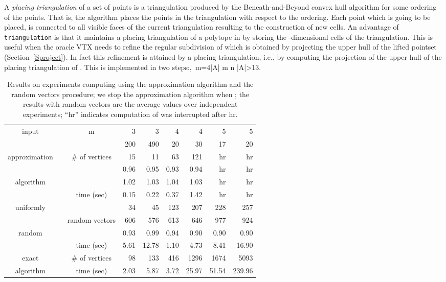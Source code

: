 \documentclass{article}
\def\A{{\mathcal A}} \def\R{{\mathcal R}}
\begin{document}
A {\it placing triangulation} of a set of points is a triangulation produced by
the Beneath-and-Beyond convex hull algorithm for some ordering of the points.
That is, the algorithm places the points in the triangulation with respect to
the ordering. Each point which is going to be placed, 
is connected to all
visible faces of the current triangulation resulting to the construction of new
cells. 
An advantage of {\tt triangulation} is that it maintains a placing
triangulation of a polytope in  by storing the -dimensional
cells of the triangulation. This is useful when the oracle VTX needs
to refine the regular subdivision of  which is obtained by projecting the
upper hull of the lifted pointset 
(Section~\ref{Sproject}).
In fact this refinement is attained by a placing triangulation, i.e., by
computing the projection of the upper hull of the placing triangulation of
.
This is implemented in two steps:,\ m=4|\A| m   n  |\A|>13.

\renewcommand{\tabcolsep}{0.3cm} \begin{table*}[t]\footnotesize
\centering
\begin{tabular}{@{} c@{}c @{\hspace{0.2cm}}
|@{\hspace{0.5cm}}  c  @{\hspace{0.2cm}}  |  
@{\hspace{0.5cm}} rrrrrr  @{}}
\multirow{2}{*}{{ input}}
& & m & 3 & 3 & 4 & 4 & 5 & 5\\ 
& & & 200 & 490& 20 & 30& 17& 20\\\hline
\multirow{2}{*}{{ approximation}} &
& \# of  vertices&15 & 11& 63 & 121 & hr &hr\\
& & & 0.96& 0.95& 0.93& 0.94 & hr
&hr\\
\multirow{2}{*}{{ algorithm}}
& & &1.02& 1.03 & 1.04& 1.03& hr
&hr\\
& & time (sec)& 0.15& 0.22& 0.37& 1.42& hr &hr\\\hline
\multirow{2}{*}{{ uniformly }}
&
& & 34& 45& 123 & 207&  228& 257\\ 
& & random vectors& 606 & 576& 613& 646& 977& 924\\
 \multirow{2}{*}{{ random}}
& & & 0.93& 0.99& 0.94 & 0.90& 0.90& 0.90\\
& & time (sec)& 5.61& 12.78& 1.10&4.73& 8.41& 16.90\\\hline
\multirow{1}{*}{{ exact}}
&
 & \# of 
vertices& 98 & 133& 416& 1296& 1674& 5093\\
\multirow{1}{*}{{ algorithm}}
& & time (sec)& 2.03& 5.87& 3.72& 25.97 &51.54& 239.96\\
\end{tabular}
\caption{Results on experiments computing  using the
approximation algorithm and the random vectors procedure; we stop the
approximation algorithm when
; the results with random vectors
are the average
values over  independent experiments; ``hr'' indicates 
computation of  was interrupted after hr. 
\label{randQ}}
\end{table*}
\end{document}
